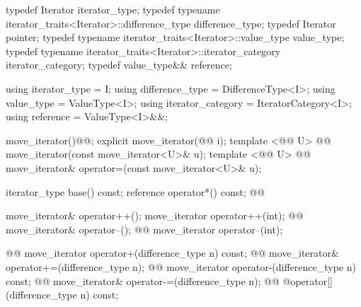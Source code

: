 %
\begin{codeblock}
namespace std {
  template <@@>
    @@
  class move_iterator {
  public:
\end{codeblock}\begin{removedblock}\begin{codeblock}
    typedef Iterator                                              iterator_type;
    typedef typename iterator_traits<Iterator>::difference_type   difference_type;
    typedef Iterator                                              pointer;
    typedef typename iterator_traits<Iterator>::value_type        value_type;
    typedef typename iterator_traits<Iterator>::iterator_category iterator_category;
    typedef value_type&&                                          reference;
\end{codeblock}\end{removedblock}\begin{addedblock}\begin{codeblock}
    using iterator_type = I;
    using difference_type = DifferenceType<I>;
    using value_type = ValueType<I>;
    using iterator_category = IteratorCategory<I>;
    using reference = ValueType<I>&&;
\end{codeblock}\end{addedblock}\begin{codeblock}

    move_iterator()@@;
    explicit move_iterator(@@ i);
    template <@@ U>
      @@
    move_iterator(const move_iterator<U>& u);
    template <@@ U>
      @@
    move_iterator& operator=(const move_iterator<U>& u);

    iterator_type base() const;
    reference operator*() const;
    @@

    move_iterator& operator++();
    move_iterator operator++(int);
    @@
      move_iterator& operator--();
    @@
      move_iterator operator--(int);

    @@
      move_iterator operator+(difference_type n) const;
    @@
      move_iterator& operator+=(difference_type n);
    @@
      move_iterator operator-(difference_type n) const;
    @@
      move_iterator& operator-=(difference_type n);
    @@
      @\unspec@ operator[](difference_type n) const;


\end{codeblock}
